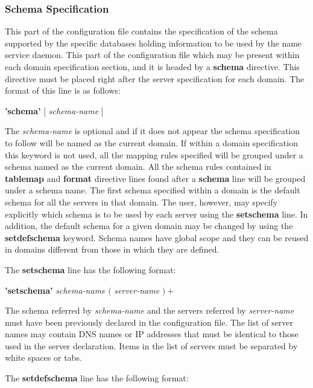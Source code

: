 \subsubsection{Schema Specification}

This part of the configuration file contains the specification of the 
schema supported by the specific databases holding information to be
used by the name service daemon. This part of the configuration file
which may be present within each domain specification section, and it
is headed by a {\bf schema} directive. This directive must be placed 
right after the server specification for each domain. The format of
this line is as follows:

\begin{center}
{\bf 'schema'} $[$ {\em schema-name} $]$
\end{center}

The {\em schema-name} is optional and if it does not appear the
schema specification to follow will be named as the current domain.
If within a domain specification this keyword is not used, all 
the mapping rules specified will be grouped under a schema named as
the current domain. All the schema rules contained in {\bf tablemap}
and {\bf format} directive lines found after a {\bf schema} line will be
grouped under a schema name. The first schema specified within a
domain is the default schema for all the servers in that domain.
The user, however, may specify explicitly which schema is to be used
by each server using the {\bf setschema} line. In addition, the
default schema for a given domain may be changed by using the 
{\bf setdefschema} keyword. Schema names have global scope and they
can be reused in domains different from those in which they are
defined.

The {\bf setschema} line has the following format:

\begin{center}
{\bf 'setschema'} {\em schema-name} $($ {\em server-name } $)+$
\end{center}

The schema referred by {\em schema-name} and the servers referred by 
{\em server-name } must have been previously declared in the
configuration file. The list of server names may contain DNS names or
IP addresses that must be identical to those used in the server
declaration. Items in the list of servers must be separated by white
spaces or tabs.

The {\bf setdefschema} line has the following format:

